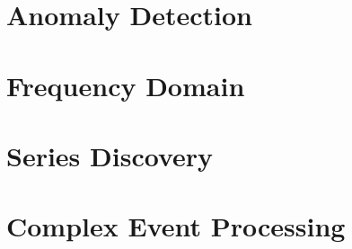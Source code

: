 \documentclass[11pt,color=green,table]{elegantbook}
\begin{document}
\chapter{Anomaly Detection}







\chapter{Frequency Domain}







\chapter{Series Discovery}




\chapter{Complex Event Processing}







\end{document}
